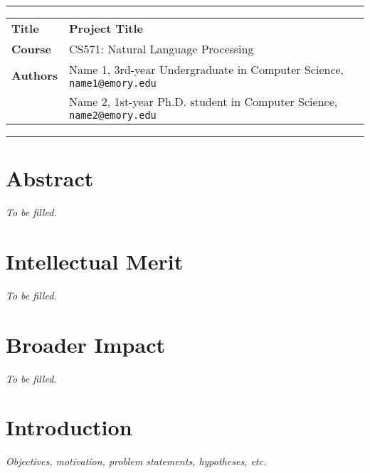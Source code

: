 \documentclass[10pt]{article}
\begin{document}
\thispagestyle{empty}

\hrule
\vspace{1mm}
\noindent\begin{tabular}{ll}
\bf Title   & \textbf{Project Title} \\
\bf Course  & CS571: Natural Language Processing \\
\bf Authors & Name 1, 3rd-year Undergraduate in Computer Science, \texttt{name1@emory.edu} \\ 
            & Name 2, 1st-year Ph.D. student in Computer Science, \texttt{name2@emory.edu} \\ 
\end{tabular}
\vspace{1mm}
\hrule


\section*{Abstract}

\textit{To be filled.}


\section*{Intellectual Merit}

\textit{To be filled.}


\section*{Broader Impact}

\textit{To be filled.}

\pagebreak


\section{Introduction}

\textit{Objectives, motivation, problem statements, hypotheses, etc.}

\end{document}
